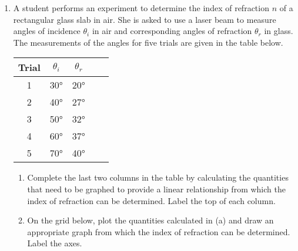 \documentclass{../../../oss-apphys}
\begin{document}
\begin{enumerate}[leftmargin=15pt]
\item A student performs an experiment to determine the index of refraction $n$
  of a rectangular glass slab in air. She is asked to use a laser beam to
  measure angles of incidence $\theta_i$ in air and corresponding angles of
  refraction $\theta_r$ in glass. The measurements of the angles for five
  trials are given in the table below.
  \begin{center}
    \bgroup
    \def\arraystretch{1.7}
    \begin{tabular}{|c|c|c|p{1in}|p{1in}|}
      \hline
      Trial & $\theta_i$ & $\theta_r$ & & \\ \hline
      \hspace{.2in}1\hspace{.2in} & \hspace{.2in}\ang{30}\hspace{.2in} &
      \hspace{.2in}\ang{20}\hspace{.2in} & & \\ \hline
      2 & \ang{40} & \ang{27} & & \\ \hline
      3 & \ang{50} & \ang{32} & & \\ \hline
      4 & \ang{60} & \ang{37} & & \\ \hline
      5 & \ang{70} & \ang{40} & & \\ \hline
    \end{tabular}
    \egroup
  \end{center}
  \begin{enumerate}
  \item Complete the last two columns in the table by calculating the
    quantities that need to be graphed to provide a linear relationship from
    which the index of refraction can be determined. Label the top of each
    column.
  \item On the grid below, plot the quantities calculated in (a) and draw an
    appropriate graph from which the index of refraction can be determined.
    Label the axes.
    

\end{enumerate}
\end{enumerate}
\end{document}
